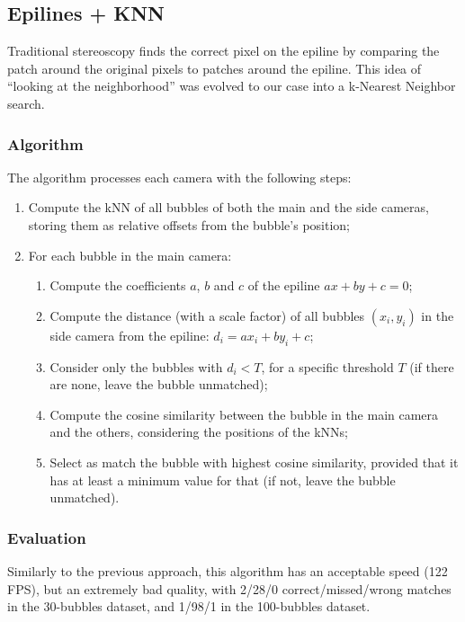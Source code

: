\subsection{Epilines + KNN}
\label{sec:match:epi-knn}

Traditional stereoscopy finds the correct pixel on the epiline by comparing the patch around the original pixels to patches around the epiline.
This idea of ``looking at the neighborhood'' was evolved to our case into a k-Nearest Neighbor search.

\subsubsection{Algorithm}

The algorithm processes each camera with the following steps:
\begin{enumerate}
	\itemsep 0em
	\item Compute the kNN of all bubbles of both the main and the side cameras, storing them as relative offsets from the bubble's position;
	\item For each bubble in the main camera:
	      \begin{enumerate}
		      \item Compute the coefficients $a$, $b$ and $c$ of the epiline $ax+by+c{=}0$;
		      \item Compute the distance (with a scale factor) of all bubbles $(x_i, y_i)$ in the side camera from the epiline: $d_i = ax_i + by_i + c$;
		      \item Consider only the bubbles with $d_i<T$, for a specific threshold $T$ (if there are none, leave the bubble unmatched);
		      \item Compute the cosine similarity between the bubble in the main camera and the others, considering the positions of the kNNs;
		      \item Select as match the bubble with highest cosine similarity, provided that it has at least a minimum value for that (if not, leave the bubble unmatched).
	      \end{enumerate}
\end{enumerate}

\subsubsection{Evaluation}

Similarly to the previous approach, this algorithm has an acceptable speed (122 FPS), but an extremely bad quality, with 2/28/0 correct/missed/wrong matches in the 30-bubbles dataset, and 1/98/1 in the 100-bubbles dataset.
